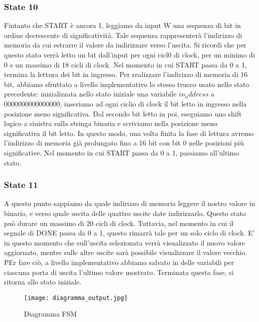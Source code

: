 \documentclass{article}
\begin{document}
\subsubsection{State 10}
Fintanto che START è ancora 1, leggiamo da input W una sequenza di bit in ordine decrescente di significatività. Tale sequenza rappresenterà l'indirizzo di memoria da cui estrarre il valore da indirizzare verso l'uscita. Si ricordi che per questo stato verrà letto un bit dall'input per ogni cicl0 di clock, per un minimo di 0 e un massimo di 18 cicli di clock. Nel momento in cui START passa da 0 a 1, termina la lettura dei bit in ingresso. Per realizzare l'indirizzo di memoria di 16 bit, abbiamo sfruttato a livello implementativo lo stesso trucco usato nello stato precedente: inizializzata nello stato iniziale una variabile $in_address$ a 0000000000000000, inseriamo ad ogni ciclio di clock il bit letto in ingresso nella posizione meno significativa. Dal secondo bit letto in poi, eseguiamo uno shift logico a sinistra sulla stringa binaria e scriviamo nella posizione meno significativa il bit letto. In questo modo, una volta finita la fase di lettura avremo l'indirizzo di memoria già prolungato fino a 16 bit con bit 0 nelle posizioni più significative. Nel momento in cui START passa da 0 a 1, passiamo all'ultimo stato.

\subsubsection{State 11}
A questo punto sappiamo da quale indirizzo di memoria leggere il nostro valore in binario, e verso quale uscita delle quattro uscite date indirizzarlo. Questo stato può durare un massimo di 20 cicli di clock. Tuttavia, nel momento in cui il segnale di DONE passa da 0 a 1, questo rimarrà tale per un solo ciclo di clock. E' in questo momento che sull'uscita selezionata verrà visualizzato il nuovo valore aggiornato, mentre sulle altre uscite sarà possibile visualizzare il valore vecchio. PEr fare ciò, a livello implementativo abbiamo salvato in delle variabili per ciascuna porta di uscita l'ultimo valore mostrato. Terminata questa fase, si ritorna allo stato iniziale.

\begin{figure}[H]
\centerline{\texttt{[image: diagramma\_output.jpg]}}
\caption{Diagramma FSM}
\label{fig}
\end{figure}
\end{document}
